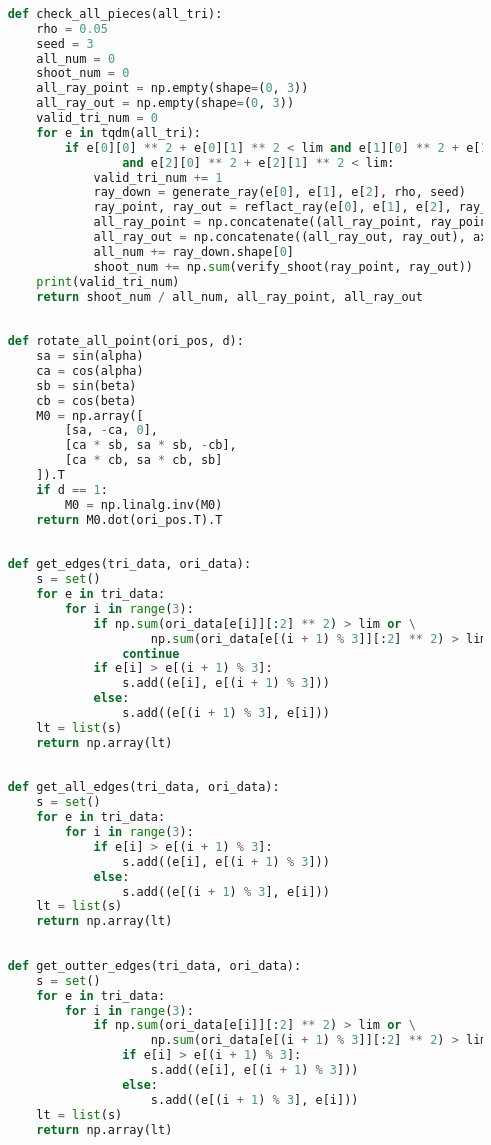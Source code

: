\documentclass[withoutpreface,bwprint,fontset=macnew]{cumcmthesis} %
\begin{document}
\begin{appendices}
\begin{lstlisting}[language=python]
	
	def check_all_pieces(all_tri):
	    rho = 0.05
	    seed = 3
	    all_num = 0
	    shoot_num = 0
	    all_ray_point = np.empty(shape=(0, 3))
	    all_ray_out = np.empty(shape=(0, 3))
	    valid_tri_num = 0
	    for e in tqdm(all_tri):
	        if e[0][0] ** 2 + e[0][1] ** 2 < lim and e[1][0] ** 2 + e[1][1] ** 2 < lim \
	                and e[2][0] ** 2 + e[2][1] ** 2 < lim:
	            valid_tri_num += 1
	            ray_down = generate_ray(e[0], e[1], e[2], rho, seed)
	            ray_point, ray_out = reflact_ray(e[0], e[1], e[2], ray_down)
	            all_ray_point = np.concatenate((all_ray_point, ray_point), axis=0)
	            all_ray_out = np.concatenate((all_ray_out, ray_out), axis=0)
	            all_num += ray_down.shape[0]
	            shoot_num += np.sum(verify_shoot(ray_point, ray_out))
	    print(valid_tri_num)
	    return shoot_num / all_num, all_ray_point, all_ray_out
	
	
	def rotate_all_point(ori_pos, d):
	    sa = sin(alpha)
	    ca = cos(alpha)
	    sb = sin(beta)
	    cb = cos(beta)
	    M0 = np.array([
	        [sa, -ca, 0],
	        [ca * sb, sa * sb, -cb],
	        [ca * cb, sa * cb, sb]
	    ]).T
	    if d == 1:
	        M0 = np.linalg.inv(M0)
	    return M0.dot(ori_pos.T).T
	
	
	def get_edges(tri_data, ori_data):
	    s = set()
	    for e in tri_data:
	        for i in range(3):
	            if np.sum(ori_data[e[i]][:2] ** 2) > lim or \
	                    np.sum(ori_data[e[(i + 1) % 3]][:2] ** 2) > lim:
	                continue
	            if e[i] > e[(i + 1) % 3]:
	                s.add((e[i], e[(i + 1) % 3]))
	            else:
	                s.add((e[(i + 1) % 3], e[i]))
	    lt = list(s)
	    return np.array(lt)
	
	
	def get_all_edges(tri_data, ori_data):
	    s = set()
	    for e in tri_data:
	        for i in range(3):
	            if e[i] > e[(i + 1) % 3]:
	                s.add((e[i], e[(i + 1) % 3]))
	            else:
	                s.add((e[(i + 1) % 3], e[i]))
	    lt = list(s)
	    return np.array(lt)
	
	
	def get_outter_edges(tri_data, ori_data):
	    s = set()
	    for e in tri_data:
	        for i in range(3):
	            if np.sum(ori_data[e[i]][:2] ** 2) > lim or \
	                    np.sum(ori_data[e[(i + 1) % 3]][:2] ** 2) > lim:
	                if e[i] > e[(i + 1) % 3]:
	                    s.add((e[i], e[(i + 1) % 3]))
	                else:
	                    s.add((e[(i + 1) % 3], e[i]))
	    lt = list(s)
	    return np.array(lt)
	

\end{lstlisting}
\end{appendices}
\end{document}
